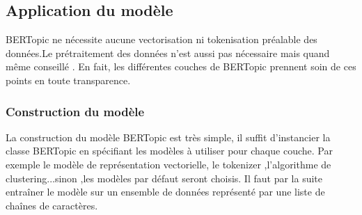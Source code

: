 \documentclass[12pt]{extarticle}
\begin{document}
\subsection{Application du modèle}
BERTopic ne nécessite aucune vectorisation  ni tokenisation préalable  des données.Le prétraitement des données n’est aussi  pas nécessaire mais quand même conseillé . En fait, les différentes couches de BERTopic prennent soin de ces points en toute transparence.
\subsubsection{Construction du modèle }
La construction du modèle BERTopic est très simple, il suffit d’instancier la classe BERTopic en spécifiant les modèles à utiliser pour chaque couche. Par exemple le modèle  de représentation vectorielle, le tokenizer ,l’algorithme de clustering...sinon ,les modèles par défaut seront choisis. Il faut par la suite entraîner le modèle sur un ensemble de données représenté  par une liste de chaînes de caractères.
\end{document}
